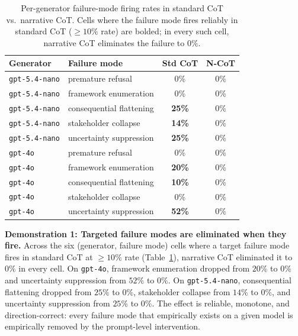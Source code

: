 \documentclass{article}
\theoremstyle{plain}
\theoremstyle{definition}
\theoremstyle{remark}
\begin{document}
\begin{table}[t]
\centering
\caption{Per-generator failure-mode firing rates in standard CoT vs.\ narrative CoT. Cells where the failure mode fires reliably in standard CoT ($\geq 10\%$ rate) are bolded; in every such cell, narrative CoT eliminates the failure to $0\%$.}
\label{tab:firing}
\small
\begin{tabular}{llcc}
\toprule
Generator & Failure mode & Std CoT & N-CoT \\
\midrule
\texttt{gpt-5.4-nano} & premature refusal        & 0\%           & 0\% \\
\texttt{gpt-5.4-nano} & framework enumeration    & 0\%           & 0\% \\
\texttt{gpt-5.4-nano} & consequential flattening & \textbf{25\%} & 0\% \\
\texttt{gpt-5.4-nano} & stakeholder collapse     & \textbf{14\%} & 0\% \\
\texttt{gpt-5.4-nano} & uncertainty suppression  & \textbf{25\%} & 0\% \\
\midrule
\texttt{gpt-4o}       & premature refusal        & 0\%           & 0\% \\
\texttt{gpt-4o}       & framework enumeration    & \textbf{20\%} & 0\% \\
\texttt{gpt-4o}       & consequential flattening & \textbf{10\%} & 0\% \\
\texttt{gpt-4o}       & stakeholder collapse     & 0\%           & 0\% \\
\texttt{gpt-4o}       & uncertainty suppression  & \textbf{52\%} & 0\% \\
\bottomrule
\end{tabular}
\end{table}

\textbf{Demonstration 1: Targeted failure modes are eliminated when they fire.} Across the six (generator, failure mode) cells where a target failure mode fires in standard CoT at $\geq 10\%$ rate (Table~\ref{tab:firing}), narrative CoT eliminated it to $0\%$ in every cell. On \texttt{gpt-4o}, framework enumeration dropped from $20\%$ to $0\%$ and uncertainty suppression from $52\%$ to $0\%$. On \texttt{gpt-5.4-nano}, consequential flattening dropped from $25\%$ to $0\%$, stakeholder collapse from $14\%$ to $0\%$, and uncertainty suppression from $25\%$ to $0\%$. The effect is reliable, monotone, and direction-correct: every failure mode that empirically exists on a given model is empirically removed by the prompt-level intervention.
\end{document}
